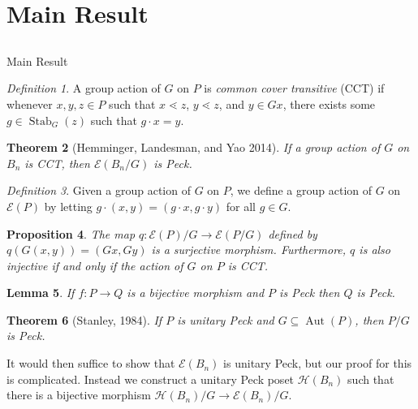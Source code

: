\documentclass{beamer}
\newtheorem{thm}{Theorem}
\newtheorem{lem}[thm]{Lemma}
\newtheorem{prop}[thm]{Proposition}
\theoremstyle{remark}
\newtheorem{defn}[thm]{Definition}
\def\Stab{\operatorname{Stab}}
\begin{document}

\section{Main Result}
\subsection{}

\begin{frame}{Main Result}
\begin{defn}
A group action of $G$ on $P$ is \textit{common cover transitive} (CCT) if whenever $x,y,z\in P$ such that $x\lessdot z$, $y\lessdot z$, and $y\in Gx$, there exists some $g\in \Stab_G(z)$ such that $g\cdot x = y$.
\end{defn}

\begin{thm}[Hemminger, Landesman, and Yao 2014]
If a group action of $G$ on $B_n$ is CCT, then $\mathcal{E}(B_n/G)$ is Peck.
\end{thm}
\end{frame}








\begin{frame}
\begin{defn}
Given a group action of $G$ on $P$, we define a group action of $G$ on $\mathcal{E}(P)$ by letting $g\cdot (x,y) = (g\cdot x,g\cdot y)$ for all $g\in G$.
\end{defn}
\pause
\begin{prop}
The map $q\colon \mathcal{E}(P)/G\rightarrow \mathcal{E}(P/G)$ defined by $q(G(x,y)) = (Gx,Gy)$ is a surjective morphism.  Furthermore, $q$ is also injective if and only if the action of $G$ on $P$ is CCT.
\end{prop}

\begin{lem}
If $f:P\rightarrow Q$ is a bijective morphism and $P$ is Peck then $Q$ is Peck.
\end{lem}
\end{frame}







\begin{frame}
\begin{thm}[Stanley, 1984]
If $P$ is unitary Peck and $G\subseteq\operatorname{Aut}(P)$, then $P/G$ is Peck.
\end{thm}

It would then suffice to show that $\mathcal{E}(B_n)$ is unitary Peck, but our proof for this is complicated.  Instead we construct a unitary Peck poset $\mathcal{H}(B_n)$ such that there is a bijective morphism $\mathcal{H}(B_n)/G\rightarrow \mathcal{E}(B_n)/G$.
\end{frame}
\end{document}
